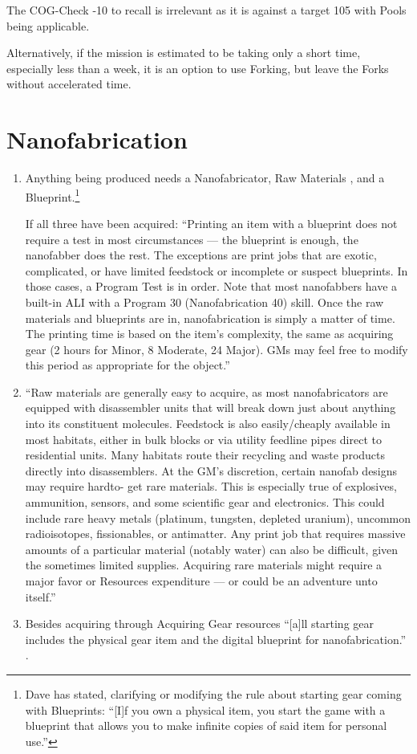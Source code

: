 The COG-Check -10 to recall is irrelevant as it is against a target 105 with Pools being applicable.

Alternatively, if the mission is estimated to be taking only a short time, especially less than a week, it is an option to use \gls{Forking}, but leave the \glspl{Fork} without accelerated time.

\section{Nanofabrication}

\begin{enumerate}
    \item Anything being produced needs a \gls{Nanofabricator}, Raw Materials \citep[p. 314]{ep2e_1.1_2019}, and a \gls{Blueprint}.\footnote{Dave has stated, clarifying or modifying the rule about starting gear coming with \glspl{Blueprint}: “[I]f you own a physical item, you start the game with a blueprint that allows you to make infinite copies of said item for personal use.”}

    If all three have been acquired: “Printing an item with a blueprint does not require a test in most circumstances — the blueprint is enough, the nanofabber does the rest. The exceptions are print jobs that are exotic, complicated, or have limited feedstock or incomplete or suspect blueprints. In those cases, a Program Test is in order. Note that most nanofabbers have a built-in ALI with a Program 30 (Nanofabrication 40) skill. Once the raw materials and blueprints are in, nanofabrication is simply a matter of time. The printing time is based on the item’s complexity, the same as acquiring gear (2 hours for Minor, 8 Moderate, 24 Major). GMs may feel free to modify this period as appropriate for the object.” \citep[pg. 314]{ep2e_1.1_2019}

    \item “Raw materials are generally easy to acquire, as most nanofabricators are equipped with disassembler units that will break down just about anything into its constituent molecules. Feedstock is also easily/cheaply available in most habitats, either in bulk blocks or via utility feedline pipes direct to residential units. Many habitats route their recycling and waste products directly into disassemblers. At the GM’s discretion, certain nanofab designs may require hardto- get rare materials. This is especially true of explosives, ammunition, sensors, and some scientific gear and electronics. This could include rare heavy metals (platinum, tungsten, depleted uranium), uncommon radioisotopes, fissionables, or antimatter. Any print job that requires massive amounts of a particular material (notably water) can also be difficult, given the sometimes limited supplies. Acquiring rare materials might require a major favor or Resources expenditure — or could be an adventure unto itself.” \citep[pg. 314]{ep2e_1.1_2019}
    \item Besides acquiring  through Acquiring Gear resources “[a]ll starting gear includes the physical gear item and the digital blueprint for nanofabrication.” \citep[pg. 68]{ep2e_1.1_2019}.


\end{enumerate}
